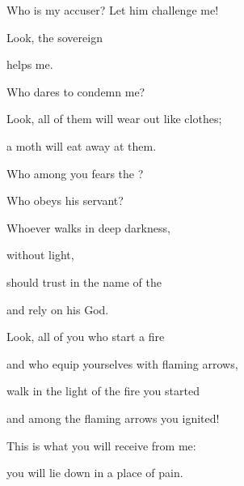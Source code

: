 {\par }{\Q Who is
my accuser? Let him challenge
me!
\par }{\Q {}Look,
the sovereign

{}
helps
me.
\par }{\Q Who dares
to condemn
me?
\par }{\Q Look,
all
of them will wear out
like clothes;
\par }{\Q a moth
will eat away at them.
\par }{\Q {}Who
among you fears
the {}?
\par }{\Q Who
obeys
his servant?
\par }{\Q Whoever
walks
in deep darkness,
\par }{\Q without
light,
\par }{\Q should trust
in the name
of the {}
\par }{\Q and rely
on his God.
\par }{\Q {}Look,
all
of you who start
a fire
\par }{\Q and who equip
yourselves with flaming arrows,
\par }{\Q walk
in the light
of the fire
you started
\par }{\Q and among the flaming arrows
you ignited!

\par }{\Q This
is what you will receive
from me:

\par }{\Q you will lie down
in a place of pain.

\par }
